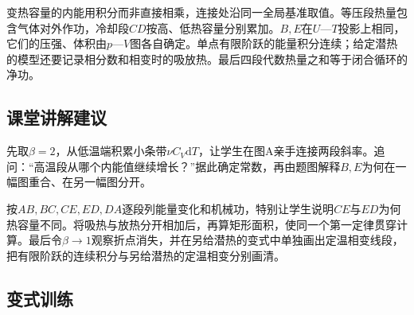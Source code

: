\documentclass[UTF8,fontset=fandol,a4paper,11pt]{ctexart}
\begin{document}
变热容量的内能用积分而非直接相乘，连接处沿同一全局基准取值。等压段热量包含气体对外作功，冷却段$CD$按高、低热容量分别累加。$B,E$在$U$—$T$投影上相同，它们的压强、体积由$p$—$V$图各自确定。单点有限阶跃的能量积分连续；给定潜热的模型还要记录相分数和相变时的吸放热。最后四段代数热量之和等于闭合循环的净功。



\subsection*{课堂讲解建议}

先取$\beta=2$，从低温端积累小条带$\nu C_V\mathrm dT$，让学生在图A亲手连接两段斜率。追问：“高温段从哪个内能值继续增长？”据此确定常数，再由题图解释$B,E$为何在一幅图重合、在另一幅图分开。

按$AB,BC,CE,ED,DA$逐段列能量变化和机械功，特别让学生说明$CE$与$ED$为何热容量不同。将吸热与放热分开相加后，再算矩形面积，使同一个第一定律贯穿计算。最后令$\beta\to1$观察折点消失，并在另给潜热的变式中单独画出定温相变线段，把有限阶跃的连续积分与另给潜热的定温相变分别画清。



\subsection*{变式训练}
\end{document}
